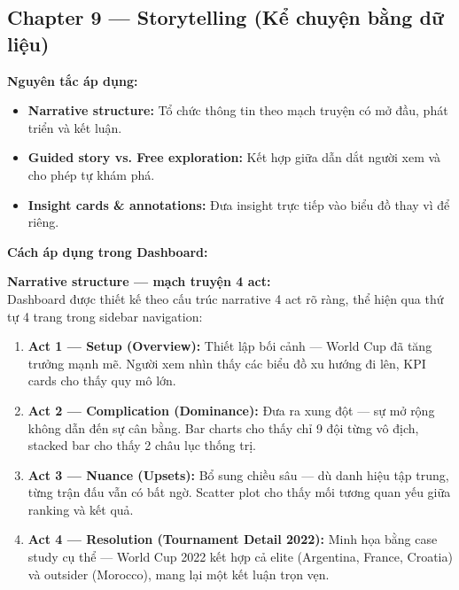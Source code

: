\documentclass[12pt,a4paper]{article}
\begin{document}
\subsection{Chapter 9 --- Storytelling (Kể chuyện bằng dữ liệu)}
\textbf{Nguyên tắc áp dụng:}
\begin{itemize}
    \item \textbf{Narrative structure:} Tổ chức thông tin theo mạch truyện có mở đầu, phát triển và kết luận.
    \item \textbf{Guided story vs. Free exploration:} Kết hợp giữa dẫn dắt người xem và cho phép tự khám phá.
    \item \textbf{Insight cards \& annotations:} Đưa insight trực tiếp vào biểu đồ thay vì để riêng.
\end{itemize}

\textbf{Cách áp dụng trong Dashboard:}

\textbf{Narrative structure --- mạch truyện 4 act:} \\
Dashboard được thiết kế theo cấu trúc narrative 4 act rõ ràng, thể hiện qua thứ tự 4 trang trong sidebar navigation:
\begin{enumerate}
    \item \textbf{Act 1 --- Setup (Overview):} Thiết lập bối cảnh --- World Cup đã tăng trưởng mạnh mẽ. Người xem nhìn thấy các biểu đồ xu hướng đi lên, KPI cards cho thấy quy mô lớn.
    \item \textbf{Act 2 --- Complication (Dominance):} Đưa ra xung đột --- sự mở rộng không dẫn đến sự cân bằng. Bar charts cho thấy chỉ 9 đội từng vô địch, stacked bar cho thấy 2 châu lục thống trị.
    \item \textbf{Act 3 --- Nuance (Upsets):} Bổ sung chiều sâu --- dù danh hiệu tập trung, từng trận đấu vẫn có bất ngờ. Scatter plot cho thấy mối tương quan yếu giữa ranking và kết quả.
    \item \textbf{Act 4 --- Resolution (Tournament Detail 2022):} Minh họa bằng case study cụ thể --- World Cup 2022 kết hợp cả elite (Argentina, France, Croatia) và outsider (Morocco), mang lại một kết luận trọn vẹn.
\end{enumerate}
\end{document}
